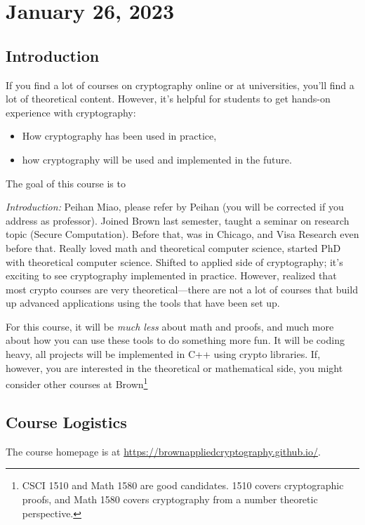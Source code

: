 \section{January 26, 2023}
\label{20230126}

\subsection{Introduction}
If you find a lot of courses on cryptography online or at universities, you'll find a lot of theoretical content. However, it's helpful for students to get hands-on experience with cryptography:
\begin{itemize}
    \item How cryptography has been used in practice,
    \item how cryptography will be used and implemented in the future.
\end{itemize}

The goal of this course is to

\emph{Introduction:} Peihan Miao, please refer by Peihan (you will be corrected if you address as professor). Joined Brown last semester, taught a seminar on research topic (Secure Computation). Before that, was in Chicago, and Visa Research even before that. Really loved math and theoretical computer science, started PhD with theoretical computer science. Shifted to applied side of cryptography; it's exciting to see cryptography implemented in practice. However, realized that most crypto courses are very theoretical---there are not a lot of courses that build up advanced applications using the tools that have been set up.

For this course, it will be \emph{much less} about math and proofs, and much more about how you can use these tools to do something more fun. It will be coding heavy, all projects will be implemented in C++ using crypto libraries. If, however, you are interested in the theoretical or mathematical side, you might consider other courses at Brown\footnote{CSCI 1510 and Math 1580 are good candidates. 1510 covers cryptographic proofs, and Math 1580 covers cryptography from a number theoretic perspective.}

\subsection{Course Logistics}
The course homepage is at \url{https://brownappliedcryptography.github.io/}.

